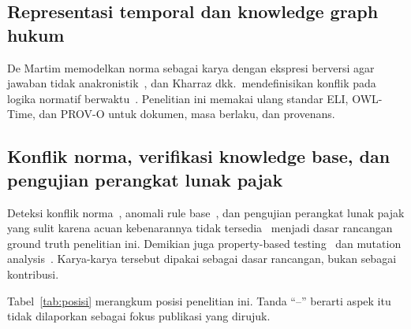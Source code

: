 \documentclass[journal,a4paper]{IEEEtran}
\makeatletter
\DeclareRobustCommand{\en}[1]{{\usefont{\f@encoding}{\f@family}{\f@series}{it}#1\/}}
\makeatother
\begin{document}
\subsection{Representasi temporal dan \en{knowledge graph} hukum}
De Martim memodelkan norma sebagai karya dengan ekspresi berversi agar jawaban tidak anakronistik~\cite{demartim2025satgraph}, dan Kharraz dkk.\ mendefinisikan konflik pada logika normatif berwaktu~\cite{kharraz2024conflicts}. Penelitian ini memakai ulang standar ELI, OWL-Time, dan PROV-O untuk dokumen, masa berlaku, dan provenans.

\subsection{Konflik norma, verifikasi \en{knowledge base}, dan pengujian perangkat lunak pajak}
Deteksi konflik norma~\cite{robaldo2024compliance,khoja2026consistency}, anomali \en{rule base}~\cite{boujelben2025anomalies}, dan pengujian perangkat lunak pajak yang sulit karena acuan kebenarannya tidak tersedia~\cite{tizpaz2023metamorphic,li2025mrgeneration} menjadi dasar rancangan \en{ground truth} penelitian ini. Demikian juga \en{property-based testing}~\cite{goldstein2024pbt,ravi2025pbtpython} dan \en{mutation analysis}~\cite{petrovic2022mutation,petrovic2021mutation}. Karya-karya tersebut dipakai sebagai dasar rancangan, bukan sebagai kontribusi.

Tabel~\ref{tab:posisi} merangkum posisi penelitian ini. Tanda ``--'' berarti aspek itu tidak dilaporkan sebagai fokus publikasi yang dirujuk.
\end{document}
